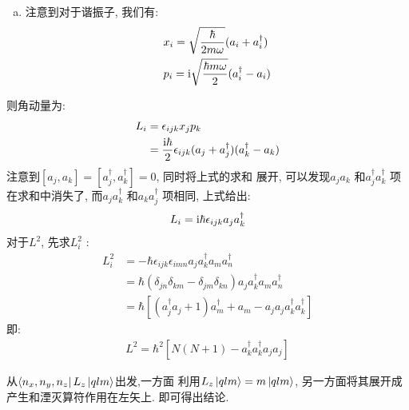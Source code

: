 \begin{exercise}[3.21]
  \begin{enumerate}[(a)]
    \item 注意到对于谐振子, 我们有:
      \begin{equation}
        \begin{aligned}
          & x_{i} = \sqrt{\frac{\hbar}{2m \omega}} (a_{i} + a_{i}^{\dagger}) \\
          & p_{i} = {\rm i}\sqrt{\frac{\hbar m \omega}{2}} (a^{\dagger}_{i} - a_{i})
        \end{aligned}
      \end{equation}
  \end{enumerate}
  则角动量为:
  \begin{equation}
    \begin{aligned}
      L_{i} &= \epsilon_{ijk}x_{j}p_{k} \\
            &= \frac{{\rm i} \hbar}{2}\epsilon_{ijk}(a_{j}+a_{j}^{\dagger})(a_{k}^{\dagger}-a_{k})
    \end{aligned}
  \end{equation}
  注意到$[a_{j},a_{k}] = [a_{j}^{\dagger}, a_{k}^{\dagger}] = 0$, 同时将上式的求和
  展开, 可以发现$a_{j}a_{k}$ 和$a_{j}^{\dagger}a_{k}^{\dagger}$ 项
  在求和中消失了, 而$a_{j}a_{k}^{\dagger}$ 和$a_{k}a_{j}^{\dagger}$ 项相同,
  上式给出:
  \begin{equation}
    \begin{aligned}
      L_{i} = {\rm i} \hbar \epsilon_{ijk} a_{j}a_{k}^{\dagger}
    \end{aligned}
  \end{equation}
  对于$L^{2}$, 先求$L_{i}^{2}$ :
  \begin{equation}
    \begin{aligned}
      L_{i}^{2} &= - \hbar \epsilon_{ijk} \epsilon_{imn} a_{j}a_{k}^{\dagger} a_{m}a_{n}^{\dagger} \\
      &= \hbar (\delta_{jn}\delta_{km} - \delta_{jm}\delta_{kn})a_{j}a_{k}^{\dagger} a_{m}a_{n}^{\dagger} \\
      &= \hbar [(a_{j}^{\dagger} a_{j} + 1) a_{m}^{\dagger} + a_{m} - a_{j}a_{j} a_{k}^{\dagger}a_{k}^{\dagger}]
    \end{aligned}
  \end{equation}
  即:
  \begin{equation}
    \begin{aligned}
      L^{2} = \hbar^{2}[N(N+1) - a_{k}^{\dagger}a_{k}^{\dagger}a_{j}a_{j}]
    \end{aligned}
  \end{equation}

  \item 从$\bra{n_{x}, n_{y}, n_{z}}L_{z}\ket{qlm}$出发,一方面
    利用$L_{z}\ket{qlm} = m \ket{qlm}$, 另一方面将其展开成
    产生和湮灭算符作用在左矢上. 即可得出结论.
\end{exercise}

